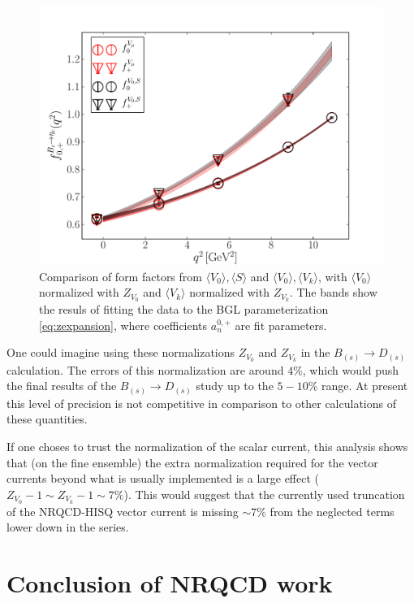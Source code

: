 \begin{figure}[htb!]
\centering
\includegraphics[scale=0.55]{images/nrqcd/Bcetac_bothways_3.pdf}
\caption{Comparison of form factors from $\langle V_0 \rangle, \langle S \rangle$ and $\langle V_0 \rangle,\langle V_k \rangle$, with $\langle V_0 \rangle$ normalized with $Z_{V_0}$ and $\langle V_k \rangle$ normalized with $Z_{V_k}$. The bands show the resuls of fitting the data to the BGL parameterization \eqref{eq:zexpansion}, where coefficients $a^{0,+}_n$ are fit parameters. \label{fig:identicle}}
\end{figure}

One could imagine using these normalizations $Z_{V_0}$ and $Z_{V_k}$ in the $B_{(s)}\to D_{(s)}$ calculation. The errors of this normalization are around $4\%$, which would push the final results of the $B_{(s)}\to D_{(s)}$ study up to the $5-10\%$ range. At present this level of precision is not competitive in comparison to other calculations of these quantities.

If one choses to trust the normalization of the scalar current, this analysis shows that (on the fine ensemble) the extra normalization required for the vector currents beyond what is usually implemented is a large effect ($Z_{V_0}-1\sim Z_{V_k}-1\sim 7\%$). This would suggest that the currently used truncation of the NRQCD-HISQ vector current is missing $\sim 7\%$ from the neglected terms lower down in the series. 

\section{Conclusion of NRQCD work}

